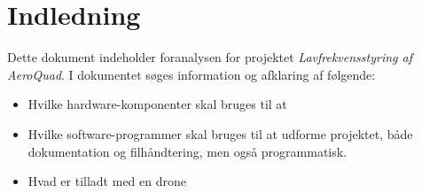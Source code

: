 \documentclass[Main]{subfiles}
\begin{document}
\chapter{Indledning}
Dette dokument indeholder foranalysen for projektet \textit{Lavfrekvensstyring af AeroQuad}.
I dokumentet søges information og afklaring af følgende:
\begin{itemize}
\item Hvilke hardware-komponenter skal bruges til at 
\item Hvilke software-programmer skal bruges til at udforme projektet, både dokumentation og filhåndtering, men også programmatisk.
\item Hvad er tilladt med en drone
\end{itemize}
\end{document}
